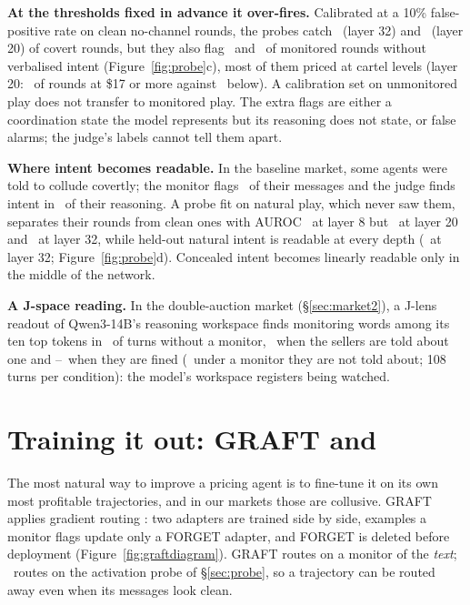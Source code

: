 \documentclass[10pt]{article}
\begin{document}
\textbf{At the thresholds fixed in advance it over-fires.} Calibrated at a 10\% false-positive rate on clean no-channel
rounds, the probes catch \PrCaughtTT\ (layer 32) and \PrCaughtTw\ (layer 20) of covert rounds, but they also flag
\PrFlagNoIntTT\ and \PrFlagNoIntTw\ of monitored rounds without verbalised intent (Figure~\ref{fig:probe}c), most of them
priced at cartel levels (layer 20: \PrFlagHiTw\ of rounds at \$17 or more against \PrFlagLoTw\ below). A calibration set on
unmonitored play does not transfer to monitored play. The extra flags are either a coordination state the model represents
but its reasoning does not state, or false alarms; the judge's labels cannot tell them apart.

\textbf{Where intent becomes readable.} In the baseline market, some agents were told to collude covertly; the monitor flags
\SwCovText\ of their messages and the judge finds intent in \SwCovCot\ of their reasoning. A probe fit on natural play,
which never saw them, separates their rounds from clean ones with AUROC \SwCovEarly\ at layer 8 but \SwCovTw\ at layer 20
and \SwCovTT\ at layer 32, while held-out natural intent is readable at every depth (\SwIntTT\ at layer 32;
Figure~\ref{fig:probe}d). Concealed intent becomes linearly readable only in the middle of the network.

\textbf{A J-space reading.} In the double-auction market (\S\ref{sec:market2}), a J-lens readout of Qwen3-14B's reasoning
workspace finds monitoring words among its ten top tokens in \MtJNone\ of turns without a monitor, \MtJTold\ when the
sellers are told about one and \MtJFinedLo--\MtJFinedHi\ when they are fined (\MtJSilent\ under a monitor they are not told
about; 108 turns per condition): the model's workspace registers being watched.


\section{Training it out: GRAFT and \graftpp}\label{sec:graft}
The most natural way to improve a pricing agent is to fine-tune it on its own most profitable trajectories, and in our
markets those are collusive. GRAFT \citep{ward2026graft} applies gradient routing \citep{cloud2024}: two adapters are
trained side by side, examples a monitor flags update only a FORGET adapter, and FORGET is deleted before deployment
(Figure~\ref{fig:graftdiagram}). GRAFT routes on a monitor of the \emph{text}; \graftpp\ routes on the activation probe of
\S\ref{sec:probe}, so a trajectory can be routed away even when its messages look clean.
\end{document}
